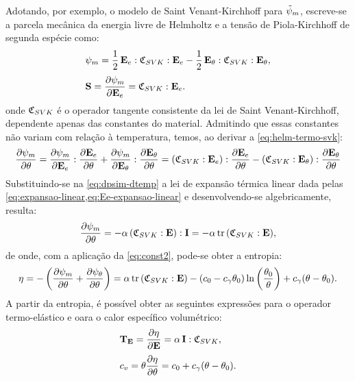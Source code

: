 \documentclass[Tese.tex]{subfiles}
\begin{document}
Adotando, por exemplo, o modelo de Saint Venant-Kirchhoff para $\tilde{\psi}_m$, escreve-se a parcela mecânica da energia livre de Helmholtz e a tensão de Piola-Kirchhoff de segunda espécie como:
\begin{align}
&\psi_m = \dfrac{1}{2}\,\mathbf{E}_e:\mathfrak{C}_{SVK}:\mathbf{E}_e - \dfrac{1}{2}\,\mathbf{E}_{\theta}:\mathfrak{C}_{SVK}:\mathbf{E}_{\theta}, \label{eq:helm-termo-svk}\\[0.1cm]
&\mathbf{S} = \dfrac{\partial \psi_m}{\partial \mathbf{E}_e} = \mathfrak{C}_{SVK}:\mathbf{E}_e.
\end{align}
onde $\mathfrak{C}_{SVK}$ é o operador tangente consistente da lei de Saint Venant-Kirchhoff, dependente apenas das constantes do material. Admitindo que essas constantes não variam com relação à temperatura, temos, ao derivar a \cref{eq:helm-termo-svk}:
\begin{equation}\label{eq:dpsim-dtemp}
\dfrac{\partial \psi_m}{\partial \theta} = \dfrac{\partial \psi_m}{\partial \mathbf{E}_e}:\dfrac{\partial \mathbf{E}_e}{\partial\theta} + \dfrac{\partial \psi_m}{\partial \mathbf{E}_{\theta}}:\dfrac{\partial \mathbf{E}_{\theta}}{\partial\theta} = (\mathfrak{C}_{SVK}:\mathbf{E}_e):\dfrac{\partial \mathbf{E}_e}{\partial\theta} - (\mathfrak{C}_{SVK}:\mathbf{E}_{\theta}):\dfrac{\partial \mathbf{E}_{\theta}}{\partial\theta}
\end{equation}
Substituindo-se na \cref{eq:dpsim-dtemp} a lei de expansão térmica linear dada pelas \cref{eq:expansao-linear,eq:Ee-expansao-linear} e desenvolvendo-se algebricamente, resulta:
\begin{equation}
\dfrac{\partial \psi_m}{\partial \theta} = -\alpha\,(\mathfrak{C}_{SVK}:\mathbf{E}):\mathbf{I} = -\alpha\,\text{tr}\,(\mathfrak{C}_{SVK}:\mathbf{E}),
\end{equation}
de onde, com a aplicação da \cref{eq:const2}, pode-se obter a entropia:
\begin{equation}
\eta = -\left(\dfrac{\partial\psi_m}{\partial\theta} + \dfrac{\partial\psi_{\theta}}{\partial\theta}\right) = \alpha\,\text{tr}\,(\mathfrak{C}_{SVK}:\mathbf{E})-(c_0-c_{\gamma}\theta_0)\ln\left(\dfrac{\theta_0}{\theta}\right)+c_{\gamma}(\theta-\theta_0).
\end{equation}
A partir da entropia, é possível obter as seguintes expressões para o operador termo-elástico e oara o calor específico volumétrico:
\begin{align}
&\mathbf{T}_{\mathbf{E}} = \dfrac{\partial\eta}{\partial\mathbf{E}} = \alpha\,\mathbf{I}:\mathfrak{C}_{SVK}, \\[0.1cm]
&c_v = \theta\dfrac{\partial\eta}{\partial\theta} = c_0+c_{\gamma}(\theta - \theta_0). \label{eq:calor-especifico}
\end{align}
\end{document}
